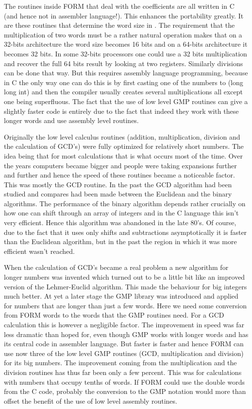 


The routines inside FORM that deal with the coefficients are all written in 
C (and hence not in assembler language!). This enhances the portability 
greatly. It are these routines that determine the word size in \FORM\@. The 
requirement that the multiplication of two words must be a rather natural 
operation makes that on a 32-bits architecture the word size becomes 16 
bits and on a 64-bits architecture it becomes 32 bits. In some 32-bits 
processors one could use a 32 bits multiplication and recover the full 64 
bits result by looking at two registers. Similarly divisions can be done 
that way. But this requires assembly language programming, because in C the 
only way one can do this is by first casting one of the numbers to (long 
long int) and then the compiler usually creates several multiplications all 
except one being superfluous. The fact that the use of low level GMP 
routines can give a slightly faster code is entirely due to the fact that 
indeed they work with these longer words and use assembly level routines.

Originally the low level calculus routines (addition, multiplication, 
division and the calculation of GCD's) were fully optimized for relatively 
short numbers. The idea being that for most calculations that is what 
occurs most of the time. Over the years computers became bigger and people 
were taking expansions further and further and hence the speed of these 
routines became a noticeable factor. This was mostly the GCD routine. In 
the past the GCD algorithm had been studied and compares had been made 
between the Euclidean and the binary algorithms. The performance of the 
binary algorithm depends rather crucially on how one can shift through an 
array of integers and in the C language this isn't very efficient. Hence 
this algorithm was abandoned in the late 80's. Of course, due to the fact 
that it uses only shifts and subtractions asymptotically it is faster than 
the Euclidean algorithm, but in the past the region in which it was more 
efficient wasn't reached.

When the calculation of GCD's became a real problem a new algorithm for 
longer numbers was invented which turned out to be a little bit like an 
improved version of the Lehmer-Euclid algorithm. This made the behaviour 
for big integers much better. At yet a later stage the GMP library was 
introduced and applied for numbers that are longer than just a few words. 
Here we need some conversion from FORM words to the words that the GMP 
routines need. For a GCD calculation this is however a negligible factor. 
The improvement in speed was far less dramatic than hoped for, even though 
GMP works with longer words and has its central code in assembler language. 
But faster is faster and hence FORM can use now three of the low level GMP 
routines (GCD, multiplication and division) for its big numbers. The 
improvement coming from the multiplication and the division routines has 
thus far been only a few percent. This was for calculations with numbers 
that occupy tenths of words. If FORM could use the double words from the C 
code, probably the conversion to the GMP notation would more than offset 
the benefit of the use of low level assembly routines.

